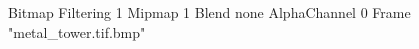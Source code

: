 {Bitmap
	{Filtering 1}
	{Mipmap 1}
	{Blend none}
	{AlphaChannel 0}
	{Frame "metal_tower.tif.bmp"}
}
